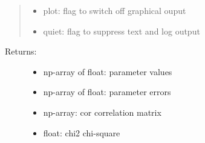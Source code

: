 \documentclass[letterpaper,10pt,english]{sphinxmanual}
\begin{document}
\begin{fulllineitems}
\begin{quote}
\begin{description}
\begin{itemize}
\item {} 
plot: flag to switch off graphical ouput

\item {} 
quiet: flag to suppress text and log output

\end{itemize}

\end{description}
\end{quote}
\begin{description}
\item[{Returns:}] \leavevmode\begin{itemize}
\item {} 
np-array of float: parameter values

\item {} 
np-array of float: parameter errors

\item {} 
np-array: cor   correlation matrix

\item {} 
float: chi2  chi-square

\end{itemize}

\end{description}

\end{fulllineitems}

\end{document}
